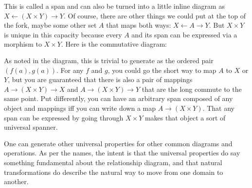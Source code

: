 \documentclass[11pt]{article}
\begin{document}

This is called a span and can also be turned into a little inline diagram as
$X \leftarrow (X\times Y) \rightarrow Y$.
Of course, there are other things we could put at the top of the fork, maybe some other
set $A$ that maps both ways: $X \leftarrow A \rightarrow Y$.
But $X\times Y$ is unique in this capacity because every $A$ and its span can be expressed
via a morphism to $X\times Y$. Here is the commutative diagram:


As noted in the diagram, this is trivial to generate as the ordered pair $(f(a), g(a))$.
For any $f$ and $g$, you could go the short way to map $A$ to $X$ or $Y$, but you are
guaranteed that there is also a pair of mappings $A\to (X\times Y) \to X$ and $A\to
(X\times Y) \to Y$ that are
the long commute to the same point.  Put differently, you can have an arbitrary
span composed of any object and mappings iff you can write down a map $A\to (X\times
Y)$. That any span can be expressed by going through $X\times Y$ makes that object a
sort of universal spanner.

One can generate other universal properties for other common diagrams and operations.
As per the names, the intent is that the universal properties do say something fundamental
about the relationship diagram, and that natural transformations do describe the
natural way to move from one domain to another.

\nocite{awodey:category}
\nocite{riehl:category}


\end{document}
